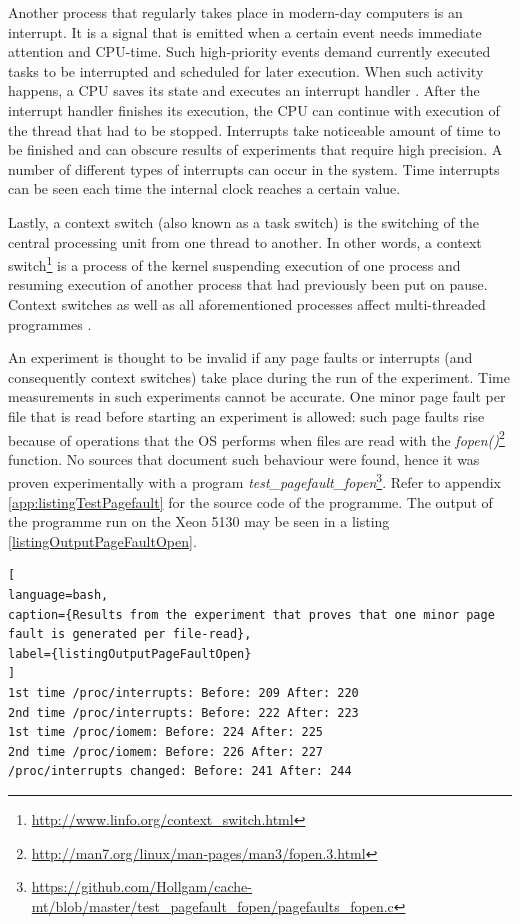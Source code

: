 Another process that regularly takes place in modern-day computers is an interrupt. It is a signal that is emitted when a certain event needs immediate attention and CPU-time. Such high-priority events demand currently executed tasks to be interrupted and scheduled for later execution. When such activity happens, a CPU saves its state and executes an interrupt handler \cite{Mogul1997}. After the interrupt handler finishes its execution, the CPU can continue with execution of the thread that had to be stopped. Interrupts take noticeable amount of time to be finished and can obscure results of experiments that require high precision. A number of different types of interrupts can occur in the system. Time interrupts can be seen each time the internal clock reaches a certain value.

Lastly, a context switch (also known as a task switch) is the switching of the central processing unit from one thread to another. In other words, a context switch\footnote{\url{http://www.linfo.org/context_switch.html}} is a process of the kernel suspending execution of one process and resuming execution of another process that had previously been put on pause. Context switches as well as all aforementioned processes affect multi-threaded programmes \cite{agarwal1992performance}.

An experiment is thought to be invalid if any page faults or interrupts (and consequently context switches) take place during the run of the experiment. Time measurements in such experiments cannot be accurate. One minor page fault per file that is read before starting an experiment is allowed: such page faults rise because of operations that the OS performs when files are read with the \textit{fopen()}\footnote{\url{http://man7.org/linux/man-pages/man3/fopen.3.html}} function. No sources that document such behaviour were found, hence it was proven experimentally with a program \textit{test\_pagefault\_fopen}\footnote{\url{https://github.com/Hollgam/cache-mt/blob/master/test\_pagefault\_fopen/pagefaults\_fopen.c}}. Refer to appendix \ref{app:listingTestPagefault} for the source code of the programme. The output of the programme run on the Xeon 5130 may be seen in a listing \ref{listingOutputPageFaultOpen}.

\begin{lstlisting}[
language=bash,
caption={Results from the experiment that proves that one minor page fault is generated per file-read},
label={listingOutputPageFaultOpen}
]
1st time /proc/interrupts: Before: 209 After: 220
2nd time /proc/interrupts: Before: 222 After: 223
1st time /proc/iomem: Before: 224 After: 225
2nd time /proc/iomem: Before: 226 After: 227
/proc/interrupts changed: Before: 241 After: 244
\end{lstlisting}

